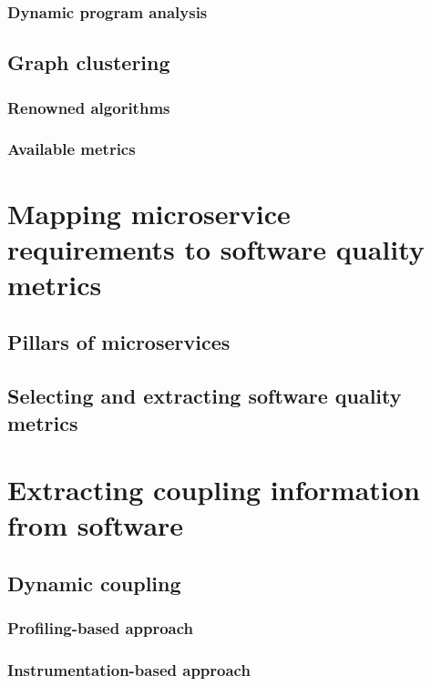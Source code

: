 \documentclass[12pt,a4paper]{report}
\begin{document}
\subsection{Dynamic program analysis}

\section{Graph clustering} \label{sect:background-graph-clustering}

\subsection{Renowned algorithms}

\subsection{Available metrics}




\chapter{Mapping microservice requirements to software quality metrics} \label{chap:rationale}

\section{Pillars of microservices}

\section{Selecting and extracting software quality metrics}




\chapter{Extracting coupling information from software}

\section{Dynamic coupling}

\subsection{Profiling-based approach}

\subsection{Instrumentation-based approach}
\end{document}
